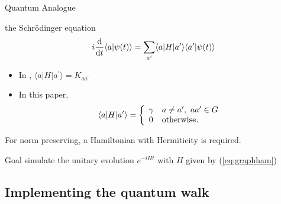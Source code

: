 \documentclass{beamer}
\makeatletter
\newcommand{\<}{\langle}
\renewcommand{\>}{\rangle}
\newcommand{\be}{\begin{equation}}
\newcommand{\ee}{\end{equation}}
\newcommand{\cond}[1]{\left\{\begin{array}{l@{~~~}l}#1\end{array}\right.}
\makeatother
\begin{document}

\begin{frame}{Quantum Analogue}

\begin{block}{the Schr\"odinger equation}
\be
  i {{\mathrm d} \over {\mathrm d}t} \<a|\psi(t)\> = \sum_{a'} \<a|H|a'\> \<a'|\psi(t)\>
\ee
\end{block}

\begin{block}{}
\begin{itemize}
    \item In \cite{FG98}, $\langle a | H | a^{\prime} \rangle = K_{aa^{\prime}}$
    \item In this paper, \be
  \<a|H|a'\> = \cond{ \gamma & a \ne a', \ aa' \in G \\
                      0      & \textrm{otherwise.} }
\label{eq:graphham}
\ee
\end{itemize}
\end{block}

\begin{alertblock}{}
For norm preserving, a Hamiltonian with Hermiticity is required.
\end{alertblock}

\begin{exampleblock}{Goal}
simulate the unitary evolution $e^{-i H t}$ with $H$ given by (\ref{eq:graphham})
\end{exampleblock}

\end{frame}



\subsection{Implementing the quantum walk}\label{subsec:implement}

\end{document}
